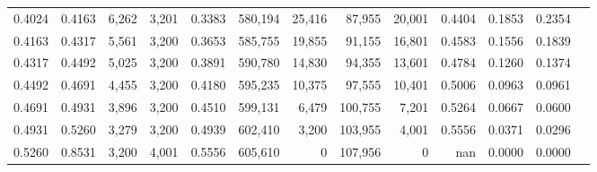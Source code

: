 \begin{tabular}{rrrrrrrrrrrrr}
0.4024 & 0.4163 &  6,262 & 3,201 &                                     0.3383 & 580,194 &  25,416 &  87,955 &  20,001 & 0.4404 & 0.1853 & 0.2354 \\
0.4163 & 0.4317 &  5,561 & 3,200 &                                     0.3653 & 585,755 &  19,855 &  91,155 &  16,801 & 0.4583 & 0.1556 & 0.1839 \\
0.4317 & 0.4492 &  5,025 & 3,200 &                                     0.3891 & 590,780 &  14,830 &  94,355 &  13,601 & 0.4784 & 0.1260 & 0.1374 \\
0.4492 & 0.4691 &  4,455 & 3,200 &                                     0.4180 & 595,235 &  10,375 &  97,555 &  10,401 & 0.5006 & 0.0963 & 0.0961 \\
0.4691 & 0.4931 &  3,896 & 3,200 &                                     0.4510 & 599,131 &   6,479 & 100,755 &   7,201 & 0.5264 & 0.0667 & 0.0600 \\
0.4931 & 0.5260 &  3,279 & 3,200 &                                     0.4939 & 602,410 &   3,200 & 103,955 &   4,001 & 0.5556 & 0.0371 & 0.0296 \\
0.5260 & 0.8531 &  3,200 & 4,001 &                                     0.5556 & 605,610 &       0 & 107,956 &       0 &    nan & 0.0000 & 0.0000 \\
\bottomrule
\end{tabular}
